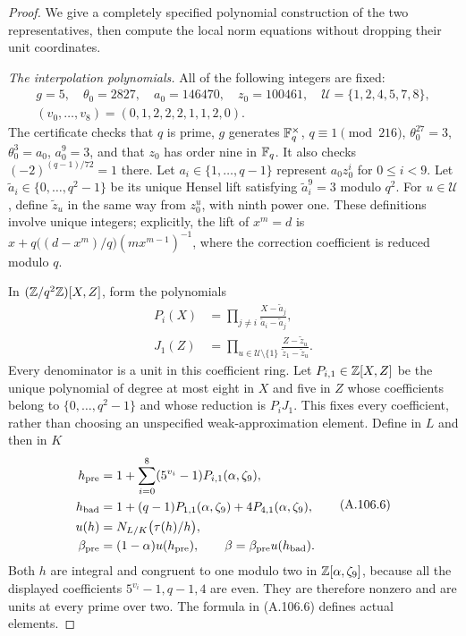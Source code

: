 \begin{proof}
We give a completely specified polynomial construction
of the two representatives, then compute the local norm
equations without dropping their unit coordinates.

\emph{The interpolation polynomials.}
All of the following integers are fixed:
\[
 \begin{gathered}
 g=5,\quad \theta_0=2827,\quad a_0=146470,
       \quad z_0=100461,\quad \mathcal U=\{1,2,4,5,7,8\},\\
 (v_0,\ldots,v_8)=(0,1,2,2,2,1,1,2,0).
 \end{gathered}
 \tag{A.106.4}
\]
The certificate checks that $q$ is prime, $g$ generates
$\mathbb F_q^\times$, $q\equiv1\pmod{216}$,
$\theta_0^{27}=3$, $\theta_0^3=a_0$,
$a_0^9=3$, and that $z_0$ has order nine in $\mathbb F_q$.
It also checks $(-2)^{(q-1)/72}=1$ there.
Let $a_i\in\{1,\ldots,q-1\}$ represent $a_0z_0^i$
for $0\le i<9$.
Let $\widetilde a_i\in\{0,\ldots,q^2-1\}$ be its
unique Hensel lift satisfying $\widetilde a_i^9=3$
modulo $q^2$.
For $u\in\mathcal U$, define $\widetilde z_u$ in
the same way from $z_0^u$, with ninth power one.
These definitions involve unique integers; explicitly,
the lift of $x^m=d$ is
$x+q\bigl((d-x^m)/q\bigr)(mx^{m-1})^{-1}$,
where the correction coefficient is reduced modulo $q$.

In $(\mathbb Z/q^2\mathbb Z)[X,Z]$, form the polynomials
\[
 \begin{split}
 P_i(X)&=\prod_{j\ne i}
                \frac{X-\widetilde a_j}
                     {\widetilde a_i-\widetilde a_j},\\
 J_1(Z)&=\prod_{u\in\mathcal U\setminus\{1\}}
                \frac{Z-\widetilde z_u}
                     {\widetilde z_1-\widetilde z_u}.
 \end{split}
 \tag{A.106.5}
\]
Every denominator is a unit in this coefficient ring.
Let $P_{i,1}\in\mathbb Z[X,Z]$ be the unique polynomial of
degree at most eight in $X$ and five in $Z$ whose
coefficients belong to $\{0,\ldots,q^2-1\}$ and whose
reduction is $P_iJ_1$.
This fixes every coefficient, rather than choosing an
unspecified weak-approximation element.
Define in $L$ and then in $K$
\[
 \begin{split}
 h_{\rm pre}&=1+\sum_{i=0}^8(5^{v_i}-1)P_{i,1}(\alpha,\zeta_9),\\
 h_{\rm bad}&=1+(q-1)P_{1,1}(\alpha,\zeta_9)
                         +4P_{4,1}(\alpha,\zeta_9),\\
 u(h)&=N_{L/K}\bigl(\tau(h)/h\bigr),\\
 \beta_{\rm pre}&=(1-\alpha)u(h_{\rm pre}),
       \qquad \beta=\beta_{\rm pre}u(h_{\rm bad}).
 \end{split}
 \tag{A.106.6}
\]
Both $h$ are integral and congruent to one modulo two
in $\mathbb Z[\alpha,\zeta_9]$, because all the displayed
coefficients $5^{v_i}-1,q-1,4$ are even.
They are therefore nonzero and are units at every
prime over two.
The formula in (A.106.6) defines actual elements.


\end{proof}
